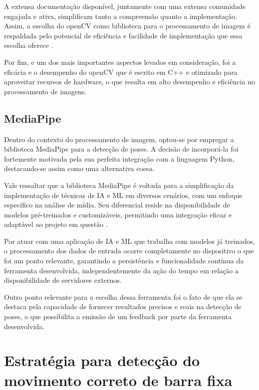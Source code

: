 A extensa documentação disponível, juntamente com uma extensa comunidade engajada e ativa, simplificam tanto a compreensão quanto a implementação. Assim, a escolha do \ac{openCV} como biblioteca para o processamento de imagem é respaldada pelo potencial de eficiência e facilidade de implementação que essa escolha oferece \cite{opencv_docs}.

Por fim, e um dos mais importantes aspectos levados em consideração, foi a eficácia e o desempenho do \ac{openCV} que é escrito em C++ e otimizado para aproveitar recursos de hardware, o que resulta em alto desempenho e eficiência no processamento de imagens.

\subsection{MediaPipe}

Dentro do contexto do processamento de imagem, optou-se por empregar a biblioteca MediaPipe para a detecção de poses. A decisão de incorporá-la foi fortemente motivada pela sua perfeita integração com a linguagem Python, destacando-se assim como uma alternativa coesa.

Vale ressaltar que a biblioteca MediaPipe é voltada para a simplificação da implementação de técnicas de \ac{IA} e \ac{ML} em diversos cenários, com um enfoque específico na análise de mídia. Seu diferencial reside na disponibilidade de modelos pré-treinados e customizáveis, permitindo uma integração eficaz e adaptável ao projeto em questão \cite{mediapipe_guide}.

Por atuar com uma aplicação de \ac{IA} e \ac{ML} que trabalha com modelos já treinados, o processamento dos dados de entrada ocorre completamente no dispositivo o que foi um ponto relevante, garantindo a persistência e funcionalidade contínua da ferramenta desenvolvida, independentemente da ação do tempo em relação a disponibilidade de servidores externos.

Outro ponto relevante para a escolha dessa ferramenta foi o fato de que ela se destaca pela capacidade de fornecer resultados precisos e reais na detecção de poses, o que possibilita a emissão de um feedback por parte da ferramenta desenvolvida.




\section[Estratégia para detecção do movimento correto de barra fixa]{Estratégia para detecção do movimento correto de barra fixa}\label{sec:Estrategia para deteccao do movimento correto de barra fixa}


